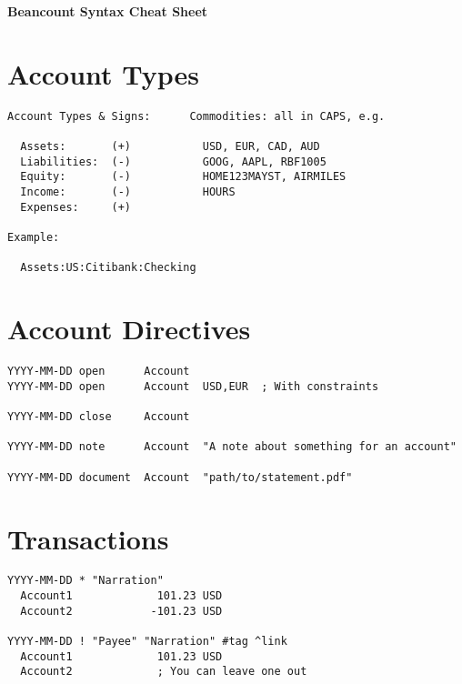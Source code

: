 \documentclass[10pt,landscape]{article}
\begin{document}
\begin{center}
  \Large{\textbf{Beancount Syntax Cheat Sheet}}
\end{center}
\vspace{1em}


\raggedright
\footnotesize
\begin{multicols}{2}

\setlength{\premulticols}{1pt}
\setlength{\postmulticols}{1pt}
\setlength{\multicolsep}{1pt}
\setlength{\columnsep}{2pt}


\section{Account Types}
\begin{verbatim}
Account Types & Signs:      Commodities: all in CAPS, e.g.

  Assets:       (+)           USD, EUR, CAD, AUD
  Liabilities:  (-)           GOOG, AAPL, RBF1005
  Equity:       (-)           HOME123MAYST, AIRMILES
  Income:       (-)           HOURS
  Expenses:     (+)

Example:

  Assets:US:Citibank:Checking
\end{verbatim}



\section{Account Directives}
\begin{verbatim}
YYYY-MM-DD open      Account
YYYY-MM-DD open      Account  USD,EUR  ; With constraints

YYYY-MM-DD close     Account

YYYY-MM-DD note      Account  "A note about something for an account"

YYYY-MM-DD document  Account  "path/to/statement.pdf"
\end{verbatim}



\section{Transactions}
\begin{verbatim}
YYYY-MM-DD * "Narration"
  Account1             101.23 USD
  Account2            -101.23 USD

YYYY-MM-DD ! "Payee" "Narration" #tag ^link
  Account1             101.23 USD
  Account2             ; You can leave one out
\end{verbatim}


\end{multicols}
\end{document}
